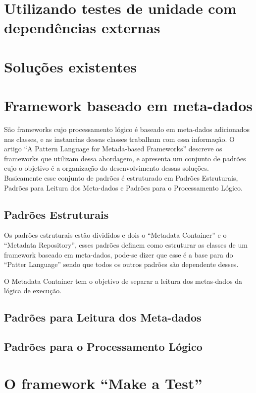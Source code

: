 \documentclass{abnt}
\begin{document}
\chapter{Utilizando testes de unidade com dependências externas} 
\chapter{Soluções existentes}
\chapter{Framework baseado em meta-dados}
São frameworks cujo processamento lógico é baseado em meta-dados adicionados nas classes, e as instancias dessas classes trabalham com essa informação. O artigo ``A Pattern Language for Metada-based Frameworks'' \cite{GUERRA-PATTERN} descreve os frameworks que utilizam dessa abordagem, e apresenta um conjunto de padrões cujo o objetivo é a organização do desenvolvimento dessas soluções.\\

Basicamente esse conjunto de padrões é estruturado em Padrões Estruturais, Padrões para Leitura dos Meta-dados e Padrões para o Processamento Lógico.\\

\section{Padrões Estruturais}

Os padrões estruturais estão divididos e dois o ``Metadata Container'' e o ``Metadata Repository'', esses padrões definem como estruturar as classes de um framework baseado em meta-dados, pode-se dizer que esse é a base para do ``Patter Language'' sendo que todos os outros padrões são dependente desses.

O Metadata Container tem o objetivo de separar a leitura dos metas-dados da lógica de execução.


\section{Padrões para Leitura dos Meta-dados}
\section{Padrões para o Processamento Lógico}

\chapter{O framework ``Make a Test''}
\end{document}
